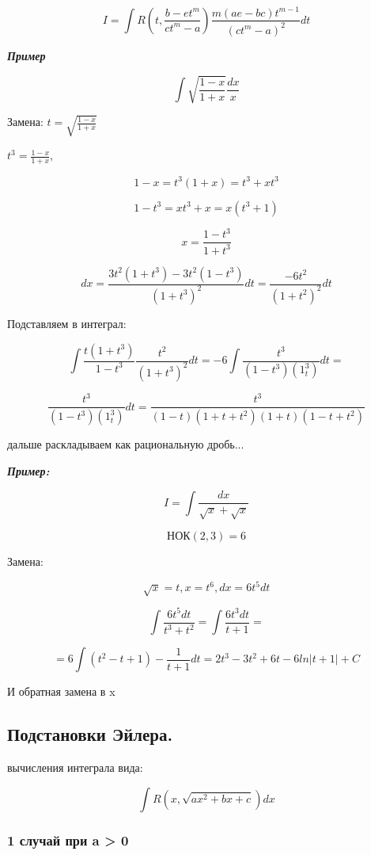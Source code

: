 \documentclass[a4paper,12pt]{article}
\theoremstyle{plain} %
\theoremstyle{definition} %
\theoremstyle{remark} %
\begin{document}
\[
	I = \int R(t, \frac{b - et^m}{ct^m - a}) \frac{m(ae - bc)t^{m-1}}{(ct^m - a)^2}dt
\]

\textit{\textbf{Пример}}

\[
	\int \sqrt{\frac{1 - x}{1 + x}} \frac{dx}{x}
\]

Замена: $t = \sqrt{\frac{1 - x}{1 + x}}$


$t^3 = \frac{1 - x}{1 + x}$,

\[
	1 - x = t^3(1 + x) = t^3 + xt^3
\]

\[
	1 - t^3 = xt^3 + x = x(t^3 + 1)
\]

\[ x = \frac{1 - t^3}{1 + t^3} \]

\[
	dx = \frac{3t^2(1 + t^3) - 3t^2(1 - t^3)}{(1 + t^3)^2} dt = \frac{-6t^2}{(1 + t^2)^2}dt
\]

Подставляем в интеграл:

\[
	\int \frac{t(1 + t^3)}{1 - t^3} \frac{t^2}{(1 + t^3)^2}dt = -6\int \frac{t^3}{(1 - t^3)(1 _ t^3)}dt =
\]

\[
	\frac{t^3}{(1 - t^3)(1 _ t^3)}dt = \frac{t^3}{(1 - t)(1 + t + t^2)(1 + t)(1 - t + t^2)}
\]

дальше раскладываем как рациональную дробь...

\textit{\textbf{Пример:}}

\[
	I = \int \frac{dx}{\sqrt{x} + \sqrt{x}}
\]

\[ \text{НОК}(2, 3) = 6 \]

Замена:

\[ \sqrt{x} = t, x = t^6, dx = 6t^5dt \]

\[
	\int \frac{6t^5dt}{t^3 + t^2} = \int \frac{6t^3dt}{t + 1}
	=
\]

\[
	= 6 \int (t^2 - t + 1) - \frac{1}{t + 1}dt = 2 t^3 - 3t^2 + 6t - 6 ln|t + 1| + C
\]

И обратная замена в x




\newpage
\subsection*{Подстановки Эйлера.                                                                          }

вычисления интеграла вида:

\[
	\int R(x, \sqrt{ax^2 + bx + c}) dx
\]

\subsubsection*{1 случай при a > 0}
\end{document}
